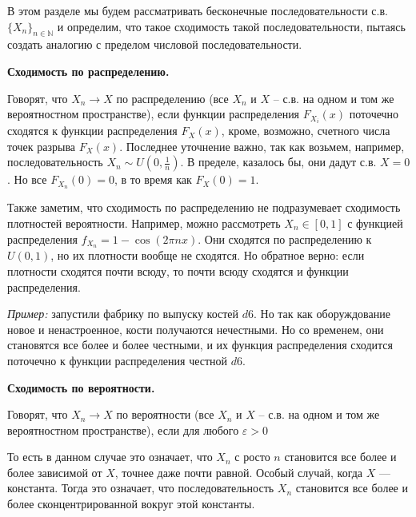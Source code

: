 \documentclass[12pt]{article}
\newcommand\N{\mathbb{N}}
\newcommand\eps{\varepsilon}
\begin{document}
В этом разделе мы будем рассматривать бесконечные последовательности с.в. $\{X_n\}_{n \in \N}$ и определим, что такое сходимость такой последовательности, пытаясь создать аналогию с пределом числовой последовательности.

\textbf{Сходимость по распределению.}

Говорят, что $X_n \to X$ по распределению (все $X_n$ и $X$ -- с.в. на одном и том же вероятностном пространстве), если функции распределения $F_{X_i}(x)$ поточечно сходятся к функции распределения $F_X(x)$, кроме, возможно, счетного числа точек разрыва $F_X(x)$. Последнее уточнение важно, так как возьмем, например, последовательность $X_n \sim U(0, \frac{1}{n})$. В пределе, казалось бы, они дадут с.в. $X = 0$. Но все $F_{X_n}(0) = 0$, в то время как $F_X(0) = 1$.

Также заметим, что сходимость по распределению не подразумевает сходимость плотностей вероятности. Например, можно рассмотреть $X_n \in [0, 1]$ с функцией распределения $f_{X_n} = 1 - \cos(2\pi n x)$. Они сходятся по распределению к $U(0, 1)$, но их плотности вообще не сходятся. Но обратное верно: если плотности сходятся почти всюду, то почти всюду сходятся и функции распределения.

\emph{Пример:} запустили фабрику по выпуску костей $d6$. Но так как оборуждование новое и ненастроенное, кости получаются нечестными. Но со временем, они становятся все более и более честными, и их функция распределения сходится поточечно к функции распределения честной $d6$.

\textbf{Сходимость по вероятности.}

Говорят, что $X_n \to X$ по вероятности (все $X_n$ и $X$ -- с.в. на одном и том же вероятностном пространстве), если для любого $\eps > 0$
\begin{center}
\end{center}
То есть в данном случае это означает, что $X_n$ с росто $n$ становится все более и более зависимой от $X$, точнее даже почти равной. Особый случай, когда $X$ --- константа. Тогда это означает, что последовательность $X_n$ становится все более и более сконцентрированной вокруг этой константы. 
\end{document}
